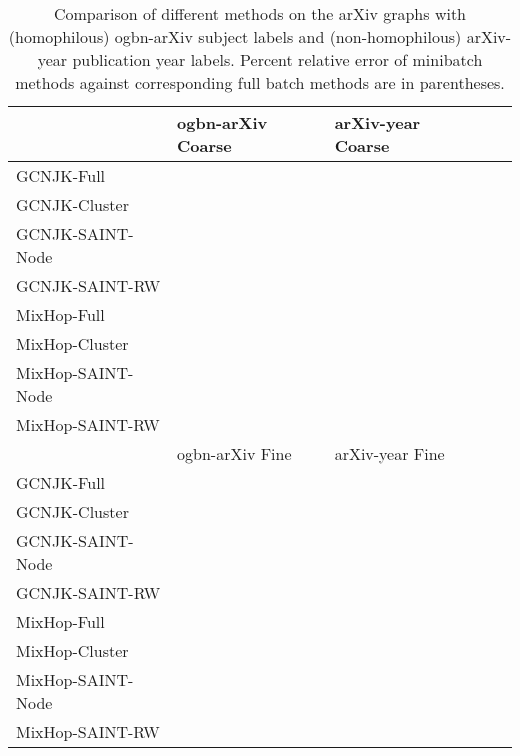 \documentclass{article}
\begin{document}
\begin{table}[ht]
    \centering
    \caption{Comparison of different methods on the arXiv graphs with (homophilous) ogbn-arXiv subject labels and (non-homophilous) arXiv-year publication year labels. Percent relative error of minibatch methods against corresponding full batch methods are in parentheses.}
    {\small
    \begin{tabular}{lllll}
    \toprule
         & ogbn-arXiv Coarse & arXiv-year Coarse \\
         \midrule
         GCNJK-Full &   &  \\
         GCNJK-Cluster &  & \\
         GCNJK-SAINT-Node &  &  \\
         GCNJK-SAINT-RW &  &  \\
         \hdashline
         MixHop-Full &   & \\
         MixHop-Cluster &  & \\
         MixHop-SAINT-Node &  & \\
         MixHop-SAINT-RW &  &  \\
         \bottomrule
         \toprule
         &  ogbn-arXiv Fine \hspace{5pt}  &  arXiv-year Fine \hspace{10pt}   \\
         \midrule
         GCNJK-Full  &   &   \\
         GCNJK-Cluster  &   &   \\
         GCNJK-SAINT-Node   &  &  \\
         GCNJK-SAINT-RW  &  &  \\
         \hdashline
         MixHop-Full  &  &    \\
         MixHop-Cluster  &  &  \\
         MixHop-SAINT-Node  &  &  \\
         MixHop-SAINT-RW  &  &   \\
         \bottomrule
    \end{tabular}
    }
    \label{tab:arxiv_compare}
\end{table}
\end{document}
